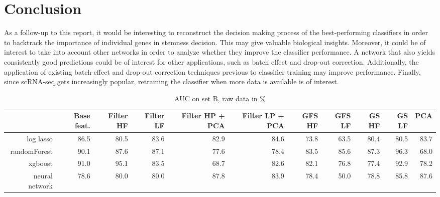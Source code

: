 \documentclass[10pt,conference,compsocconf]{IEEEtran}
\newcommand{\beginsupplement}{%
	\setcounter{table}{0}
	\renewcommand{\thetable}{S\arabic{table}}%
	\setcounter{figure}{0}
	\renewcommand{\thefigure}{S\arabic{figure}}%
}
\begin{document}
\section*{Conclusion}
As a follow-up to this report, it would be interesting to reconstruct the decision making process of the best-performing classifiers in order to backtrack the importance of individual genes in stemness decision. This may give valuable biological insights. Moreover, it could be of interest to take into account other networks in order to analyze whether they improve the classifier performance. A network that also yields consistently good predictions could be of interest for other applications, such as batch effect and drop-out correction\cite{vanDijk2017}. Additionally, the application of existing batch-effect and drop-out correction techniques previous to classifier training may improve performance. Finally, since scRNA-seq gets increasingly popular, retraining the classifier when more data is available is of interest. 
\par






\beginsupplement

\begin{table}[H]
	\centering
	\begin{tabular}{r|rrrrrrrrrr}
	\hline
	& Base feat. & Filter HF & Filter LF & Filter HP + PCA & Filter LP + PCA & GFS HF & GFS LF&GS HF &GS LF & PCA  \\ \hline
	 log lasso & 86.5 & 80.5 & 83.6 & 82.9 & 84.6 & 73.8 & 63.5 & 80.4 & 80.5 & 83.7 \\
	 randomForest & 90.1 & 87.6 & 87.1 & 77.6 & 78.4 & 83.5 & 85.6 & 87.3 & 96.3 & 68.0 \\
	 xgboost & 91.0 & 95.1 & 83.5 & 68.7 & 82.6 & 82.1 & 76.8 & 77.4 & 92.9 & 78.2 \\
	 neural network & 78.6 & 80.0 & 80.0 & 87.8 & 83.9 & 78.4 & 50.0 & 78.8 & 85.8 & 87.6 \\
	\hline
	\end{tabular}
	\caption{AUC on set B, raw data in \%}
\end{table}
\end{document}
